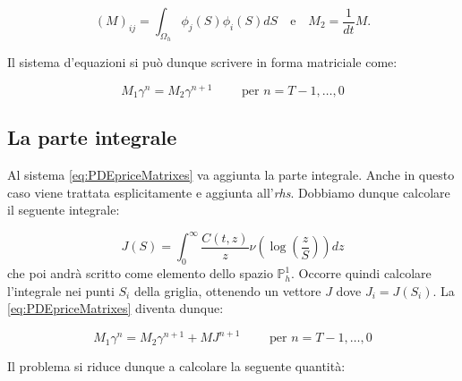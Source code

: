 \documentclass[a4paper,10pt]{report}
\theoremstyle{plain}
\theoremstyle{definition}
\theoremstyle{remark}
\begin{document}
\begin{equation*}
(M)_{ij}=\int_{\Omega_h}\phi_j(S)\phi_i(S)dS \quad\text{e}\quad M_2=\frac{1}{dt}M.
\end{equation*}

Il sistema d'equazioni si può dunque scrivere in forma matriciale come:

\begin{equation}
 \label{eq:PDEpriceMatrixes}
 M_1 \gamma^n=M_2\gamma^{n+1} \qquad \text{ per } n=T-1,\dots,0
\end{equation}

\subsection{La parte integrale}
Al sistema \eqref{eq:PDEpriceMatrixes} va aggiunta la parte integrale. Anche in questo caso viene trattata esplicitamente e aggiunta all'\emph{rhs}. Dobbiamo dunque calcolare il seguente integrale:

\begin{equation*}
 J(S)=\int_0^\infty \frac{C(t,z)}{z}\nu\left(\log\left(\frac{z}{S}\right) \right)dz
\end{equation*}
che poi andrà scritto come elemento dello spazio $\mathbb{P}_h^1$. Occorre quindi calcolare l'integrale nei punti $S_i$ della griglia, ottenendo un vettore $J$ dove $J_i=J(S_i)$. La \eqref{eq:PDEpriceMatrixes} diventa dunque: 
 
\begin{equation}
 \label{eq:PDEpriceMatrixeswithJ}
 M_1\gamma^n=M_2\gamma^{n+1}+MJ^{n+1} \qquad \text{ per } n=T-1,\dots,0
\end{equation}

Il problema si riduce dunque a calcolare la seguente quantità:
\end{document}
